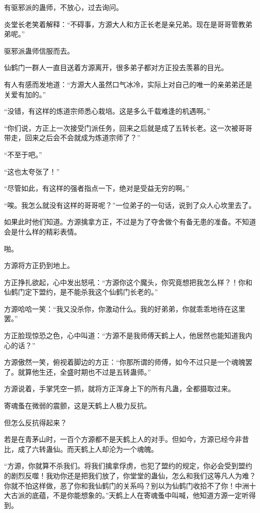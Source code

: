\begin{this_body}
有驱邪派的蛊师，不放心，过去询问。

炎堂长老笑着解释：“不碍事，方源大人和方正长老是亲兄弟。现在是哥哥管教弟弟呢。”

驱邪派蛊师信服而去。

仙鹤门一群人一直目送着方源离开，很多弟子都对方正投去羡慕的目光。

有人有感而发地道：“方源大人虽然口气冰冷，实际上对自己的唯一的亲弟弟还是关爱有加的。”

“没错，有这样的炼道宗师悉心栽培。这是多么千载难逢的机遇啊。”

“你们说，方正上一次接受门派任务，回来之后就是成了五转长老。这一次被哥哥带走，回来之后会不会就成为炼道宗师了？”

“不至于吧。”

“这也太夸张了！”

“尽管如此，有这样的强者指点一下，绝对是受益无穷的啊。”

“唉。我怎么就没有这样的哥哥呢？”一位弟子的一句话，说到了众人心坎里去了。

如果此时他们知道。方源擒拿方正，不过是为了夺舍做个有备无患的准备。不知道会是什么样的精彩表情。

啪。

方源将方正扔到地上。

方正挣扎欲起，心中发出怒吼：“方源你这个魔头，你究竟想把我怎么样？！你和仙鹤门定下盟约，是不能杀我这个仙鹤门长老的。”

方源哈哈一笑：“我又没杀你，你激动什么。我的好弟弟，你就乖乖地待在这里罢。”

方正脸现惊恐之色，心中叫道：“方源不是我师傅天鹤上人，他居然也能知道我内心的话？”

方源傲然一笑，俯视着脚边的方正：“你那所谓的师傅，如今不过只是一个魂魄罢了。就算他生还，全盛时期也不过是五转蛊师。”

方源说着，手掌凭空一抓，就将方正浑身上下的所有凡蛊，全都摄取过来。

寄魂蚤在微弱的震颤，这是天鹤上人极力反抗。

但怎么反抗得起来？

若是在青茅山时，一百个方源都不是天鹤上人的对手。但如今，方源已经今非昔比，成了六转蛊仙。而天鹤上人却沦为一个魂魄。

“方源，你就算不杀我们。将我们擒拿俘虏，也犯了盟约的规定，你必会受到盟约的剧烈反噬！我劝你还是把我们放了，你堂堂的蛊仙，怎么和我们这等凡人为难？你就不怕这样做，恶了你和我仙鹤门的关系吗？别以为仙鹤门收拾不了你！中洲十大古派的底蕴，不是你能想象的。”天鹤上人在寄魂蚤中叫喊，他知道方源一定听得到。


\end{this_body}
